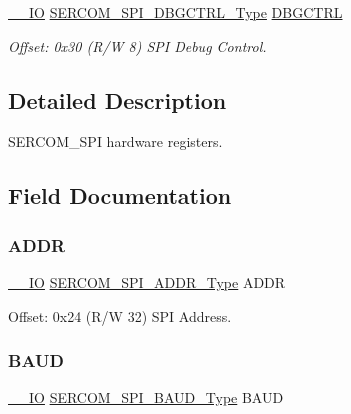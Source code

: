 \begin{DoxyCompactItemize}
\item 
\mbox{\hyperlink{core__cm0plus_8h_aec43007d9998a0a0e01faede4133d6be}{\+\_\+\+\_\+\+IO}} \mbox{\hyperlink{union_s_e_r_c_o_m___s_p_i___d_b_g_c_t_r_l___type}{S\+E\+R\+C\+O\+M\+\_\+\+S\+P\+I\+\_\+\+D\+B\+G\+C\+T\+R\+L\+\_\+\+Type}} \mbox{\hyperlink{struct_sercom_spi_afba2a830d20ee21ba14a4642fe942135}{D\+B\+G\+C\+T\+RL}}
\begin{DoxyCompactList}\small\item\em Offset\+: 0x30 (R/W 8) S\+PI Debug Control. \end{DoxyCompactList}\end{DoxyCompactItemize}


\subsection{Detailed Description}
S\+E\+R\+C\+O\+M\+\_\+\+S\+PI hardware registers. 

\subsection{Field Documentation}
\mbox{\label{struct_sercom_spi_adfdc8e8f97d66429ed66d6186409c560}} 
\subsubsection{\texorpdfstring{ADDR}{ADDR}}
{\footnotesize\ttfamily \mbox{\hyperlink{core__cm0plus_8h_aec43007d9998a0a0e01faede4133d6be}{\+\_\+\+\_\+\+IO}} \mbox{\hyperlink{union_s_e_r_c_o_m___s_p_i___a_d_d_r___type}{S\+E\+R\+C\+O\+M\+\_\+\+S\+P\+I\+\_\+\+A\+D\+D\+R\+\_\+\+Type}} A\+D\+DR}



Offset\+: 0x24 (R/W 32) S\+PI Address. 

\mbox{\label{struct_sercom_spi_aa4a9783b1bc052a33af3e36c58c762af}} 
\subsubsection{\texorpdfstring{BAUD}{BAUD}}
{\footnotesize\ttfamily \mbox{\hyperlink{core__cm0plus_8h_aec43007d9998a0a0e01faede4133d6be}{\+\_\+\+\_\+\+IO}} \mbox{\hyperlink{union_s_e_r_c_o_m___s_p_i___b_a_u_d___type}{S\+E\+R\+C\+O\+M\+\_\+\+S\+P\+I\+\_\+\+B\+A\+U\+D\+\_\+\+Type}} B\+A\+UD}



